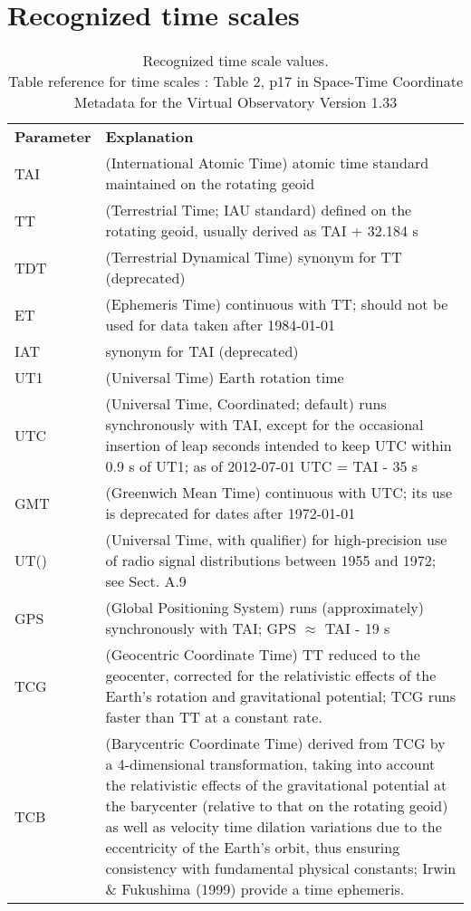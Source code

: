 
\section{Recognized time scales }
\label{appendix1}
\begin{table}
  \begin{center}
    \caption{Recognized time scale values. \\ Table reference for time scales :  Table 2, p17 in Space-Time Coordinate Metadata for the Virtual Observatory
Version 1.33}\label{tab:scales}
      \begin{tabular}{p{}p{}}
      \sptablerule
      \textbf{Parameter} & \textbf{Explanation} \\\sptablerule
TAI   & (International Atomic Time) atomic time standard maintained on the rotating geoid\\
TT    & (Terrestrial Time; IAU standard) defined on the rotating geoid, usually derived as TAI + 32.184 s\\
TDT   & (Terrestrial Dynamical Time) synonym for TT (deprecated)\\
ET    & (Ephemeris Time) continuous with TT; should not be used for data taken after 1984-01-01 \\
IAT   & synonym for TAI (deprecated) \\
UT1   & (Universal Time) Earth rotation time \\
UTC   & (Universal Time, Coordinated; default) runs synchronously with TAI, except for the occasional insertion of leap seconds intended to keep UTC within 0.9 s of UT1; as of 2012-07-01 UTC = TAI - 35 s \\
GMT   & (Greenwich Mean Time) continuous with UTC; its use is deprecated for dates after 1972-01-01\\
UT()  & (Universal Time, with qualifier) for high-precision use of radio signal distributions between 1955 and 1972; see Sect. A.9 \\
GPS   & (Global Positioning System) runs (approximately) synchronously with TAI; GPS $\approx$ TAI - 19 s\\
TCG   & (Geocentric Coordinate Time) TT reduced to the geocenter, corrected for the relativistic effects of the Earth’s rotation and gravitational potential; TCG runs faster than TT at a constant rate.\\
TCB   & (Barycentric Coordinate Time) derived from TCG by a 4-dimensional transformation, taking into account the relativistic effects of the gravitational potential at the barycenter (relative to that on the rotating geoid) as well as velocity time dilation variations due to the eccentricity of the Earth’s orbit, thus ensuring consistency with fundamental physical constants; Irwin \& Fukushima (1999) provide a time ephemeris.\\

\end{tabular}
\end{center}
\end{table}
